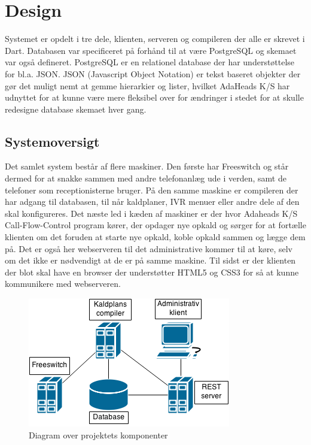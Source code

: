 \chapter{Design}
Systemet er opdelt i tre dele, klienten, serveren og compileren der alle er skrevet i Dart. Databasen var specificeret på forhånd til at være PostgreSQL og skemaet var også defineret. PostgreSQL er en relationel database der har understøttelse for bl.a. JSON.
JSON (Javascript Object Notation) er tekst baseret objekter der gør det muligt nemt at gemme hierarkier og lister, hvilket AdaHeads K/S har udnyttet for at kunne være mere fleksibel over for ændringer i stedet for at skulle redesigne database skemaet hver gang.


\section{Systemoversigt}
\label{sec:adminSystemoversigt}
Det samlet system består af flere maskiner. Den første har Freeswitch og står dermed for at snakke sammen med andre telefonanlæg ude i verden, samt de telefoner som receptionisterne bruger. På den samme maskine er compileren der har adgang til databasen, til når kaldplaner, IVR menuer eller andre dele af den skal konfigureres. Det næste led i kæden af maskiner er der hvor Adaheads K/S Call-Flow-Control program kører, der opdager nye opkald og sørger for at fortælle klienten om det foruden at starte nye opkald, koble opkald sammen og lægge dem på. Det er også her webserveren til det administrative kommer til at køre, selv om det ikke er nødvendigt at de er på samme maskine. Til sidst er der klienten der blot skal have en browser der understøtter HTML5 og CSS3 for så at kunne kommunikere med webserveren.

\begin{figure}[ht!]
\centering
\includegraphics[scale=0.8]{images/systemdiagram.png}
\caption{Diagram over projektets komponenter}
\label{fig:systemdiagram}
\end{figure}

